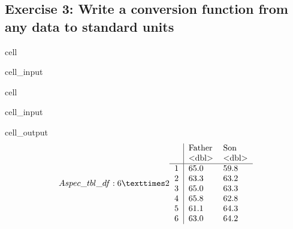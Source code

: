 \documentclass[letterpaper,10pt,english]{jupyterBook}
\begin{document}
\subsection{Exercise 3: Write a conversion function from any data to standard units}
\label{\detokenize{exercises_unit_4:exercise-3-write-a-conversion-function-from-any-data-to-standard-units}}
\begin{sphinxuseclass}{cell}\begin{sphinxVerbatimInput}

\begin{sphinxuseclass}{cell_input}
\begin{sphinxVerbatim}[commandchars=\\\{\}]

\end{sphinxVerbatim}

\end{sphinxuseclass}\end{sphinxVerbatimInput}

\end{sphinxuseclass}
\begin{sphinxuseclass}{cell}\begin{sphinxVerbatimInput}

\begin{sphinxuseclass}{cell_input}
\begin{sphinxVerbatim}[commandchars=\\\{\}]
\end{sphinxVerbatim}

\end{sphinxuseclass}\end{sphinxVerbatimInput}
\begin{sphinxVerbatimOutput}

\begin{sphinxuseclass}{cell_output}\begin{equation*}
\begin{split}A spec\_tbl\_df: 6 × 2
\begin{tabular}{r|ll}
  & Father & Son\\
  & <dbl> & <dbl>\\
\hline
	1 & 65.0 & 59.8\\
	2 & 63.3 & 63.2\\
	3 & 65.0 & 63.3\\
	4 & 65.8 & 62.8\\
	5 & 61.1 & 64.3\\
	6 & 63.0 & 64.2\\
\end{tabular}\end{split}
\end{equation*}
\end{sphinxuseclass}\end{sphinxVerbatimOutput}

\end{sphinxuseclass}
\end{document}
